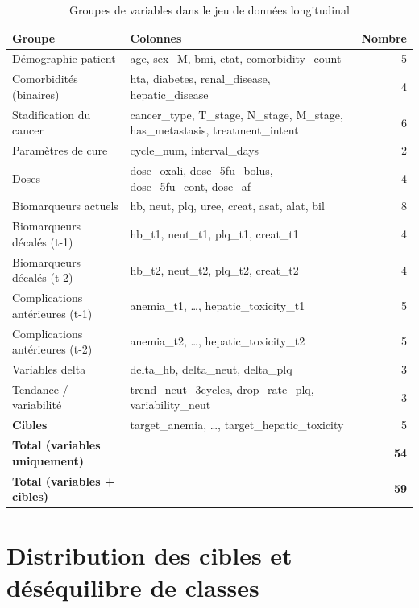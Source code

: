 \documentclass[12pt,a4paper]{report}
\begin{document}
\begin{table}[H]
\centering
\caption{Groupes de variables dans le jeu de données longitudinal}
\label{tab:features}
\begin{tabular}{lp{5cm}r}
\toprule
\textbf{Groupe} & \textbf{Colonnes} & \textbf{Nombre} \\
\midrule
Démographie patient & age, sex\_M, bmi, etat, comorbidity\_count & 5 \\
Comorbidités (binaires) & hta, diabetes, renal\_disease, hepatic\_disease & 4 \\
Stadification du cancer & cancer\_type, T\_stage, N\_stage, M\_stage, has\_metastasis, treatment\_intent & 6 \\
Paramètres de cure & cycle\_num, interval\_days & 2 \\
Doses & dose\_oxali, dose\_5fu\_bolus, dose\_5fu\_cont, dose\_af & 4 \\
Biomarqueurs actuels & hb, neut, plq, uree, creat, asat, alat, bil & 8 \\
Biomarqueurs décalés (t-1) & hb\_t1, neut\_t1, plq\_t1, creat\_t1 & 4 \\
Biomarqueurs décalés (t-2) & hb\_t2, neut\_t2, plq\_t2, creat\_t2 & 4 \\
Complications antérieures (t-1) & anemia\_t1, \ldots, hepatic\_toxicity\_t1 & 5 \\
Complications antérieures (t-2) & anemia\_t2, \ldots, hepatic\_toxicity\_t2 & 5 \\
Variables delta & delta\_hb, delta\_neut, delta\_plq & 3 \\
Tendance / variabilité & trend\_neut\_3cycles, drop\_rate\_plq, variability\_neut & 3 \\
\textbf{Cibles} & target\_anemia, \ldots, target\_hepatic\_toxicity & 5 \\
\midrule
\textbf{Total (variables uniquement)} & & \textbf{54} \\
\textbf{Total (variables + cibles)} & & \textbf{59} \\
\bottomrule
\end{tabular}
\end{table}

\section{Distribution des cibles et déséquilibre de classes}
\end{document}
